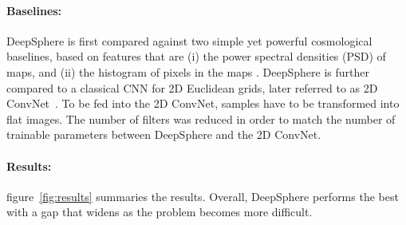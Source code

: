 \documentclass{article} %
\newcommand{\figref}[1]{figure~\ref{fig:#1}}
\newcommand{\1}{\b{1}}              %
\newcommand{\0}{\b{0}}              %
\begin{document}
\paragraph{Baselines:}
DeepSphere is first compared against two simple yet powerful cosmological baselines, based on features that are (i) the power spectral densities (PSD) of maps, and (ii) the histogram of pixels in the maps \citep{patton2017cosmologicalconstraints}.
DeepSphere is further compared to a classical CNN for 2D Euclidean grids, later referred to as 2D ConvNet~\cite{krachmalnicoff2019convolutional}.
To be fed into the 2D ConvNet, samples have to be transformed into flat images.
The number of filters was reduced in order to match the number of trainable parameters between DeepSphere and the 2D ConvNet.


\paragraph{Results:}
\figref{results} summaries the results.
Overall, DeepSphere performs the best with a gap that widens as the problem becomes more difficult.
\end{document}
